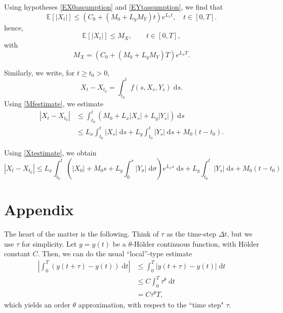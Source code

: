 \documentclass[reqno,12pt]{amsart}
\theoremstyle{plain}%
\theoremstyle{definition}
\begin{document}
Using hypotheses \eqref{EX0assumption} and \eqref{EYtassumption}, we find that
$$
\mathbb{E}[|X_t|] \leq \left( C_0 + (M_0 + L_y M_Y) t \right) e^{L_x t}, \quad t \in [0, T].
$$
hence,
\begin{equation}
    \label{EXtestimate}
    \mathbb{E}[|X_t|] \leq M_X, \qquad t \in [0, T],
\end{equation}
with
\begin{equation}
    \label{MXt}
    M_X = (C_0 + (M_0 + L_y M_Y)T)e^{L_x T}.
\end{equation}


Similarly, we write, for $t \geq t_0 > 0$,
$$
X_t - X_{t_0} = \int_{t_0}^t f(s, X_s, Y_s) \;\mathrm{d}s.
$$
Using \eqref{Mfestimate}, we estimate
\begin{align*}
    |X_t - X_{t_0}| & \leq \int_{t_0}^t \left(M_0 + L_x |X_s| + L_y|Y_s| \right)\;\mathrm{d}s \\
    & \leq L_x \int_{t_0}^t |X_s| \;\mathrm{d}s + L_y\int_{t_0}^t |Y_s|\;\mathrm{d}s + M_0(t - t_0).
\end{align*}

Using \eqref{Xtestimate}, we obtain
\begin{equation}
    |X_t - X_{t_0}| \leq L_x \int_{t_0}^t \left( |X_0| + M_0 s  + L_y \int_0^s |Y_\sigma| \;\mathrm{d}\sigma\right) e^{L_x s} \;\mathrm{d}s + L_y\int_{t_0}^t |Y_s|\;\mathrm{d}s + M_0(t - t_0)
\end{equation}

\section*{Appendix}

The heart of the matter is the following. Think of $\tau$ as the time-step $\Delta t$, but we use $\tau$ for simplicity. Let $y=y(t)$ be a $\theta$-H\"older continuous function, with H\"older constant $C$. Then, we can do the usual ``local''-type estimate
\begin{align*}
    \left|\int_0^T \left(y(t + \tau) - y(t) \right) \;\mathrm{d}t \right| & \leq \int_0^T \left|y(t + \tau) - y(t) \right| \;\mathrm{d}t \\
    & \leq C\int_0^T \tau^{\theta} \;\mathrm{d}t \\
    & = C\tau^{\theta}T,
\end{align*}
which yields an order $\theta$ approximation, with respect to the ``time step" $\tau$.
\end{document}

